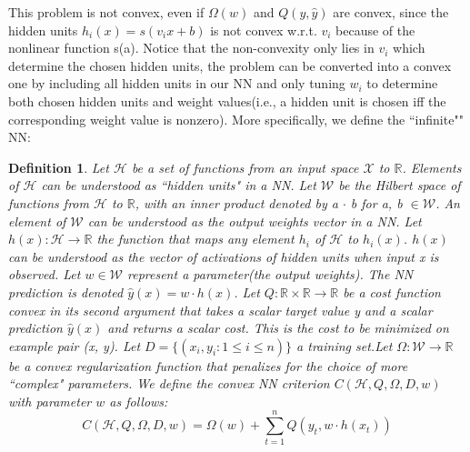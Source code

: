 \documentclass{article}
\begin{document}
This problem is not convex, even if $\Omega(w)$ and $Q(y,\hat{y})$ are convex, since the hidden units $h_{i}(x) = s(v_{i}x+b)$ is not convex w.r.t. $v_{i}$ because of the nonlinear function s(a). Notice that the non-convexity only lies in $v_{i}$ which determine the chosen hidden units, the problem can be converted into a convex one by including all hidden units in our NN and only tuning $w_{i}$ to determine both chosen hidden units and weight values(i.e., a hidden unit is chosen iff the corresponding weight value is nonzero). More specifically, we define the ``infinite"" NN:
\newtheorem{defn}{Definition}[section]
\begin{defn}
Let $\mathcal{H}$ be a set of functions from an input space $\mathcal{X}$ to $\mathbb{R}$. Elements of $\mathcal{H}$ can be understood as ``hidden units" in a NN. Let $\mathcal{W}$ be the Hilbert space of functions from $\mathcal{H}$ to $\mathbb{R}$, with an inner product denoted by a $\cdot$ b for a, b $\in \mathcal{W}$. An element of $\mathcal{W}$ can be understood as the output weights vector in a NN. Let $h(x):\mathcal{H}\rightarrow \mathbb{R}$ the function that maps any element $h_{i}$ of $\mathcal{H}$ to $h_{i}(x)$. $h(x)$ can be understood as the vector of activations of hidden units when input x is observed. Let $w \in \mathcal{W}$ represent a parameter(the output weights). The NN prediction is denoted $\hat{y}(x)= w\cdot h(x)$. Let $Q:\mathbb{R}\times \mathbb{R} \rightarrow \mathbb{R}$ be a cost function convex in its second argument that takes a scalar target value y and a scalar prediction $\hat{y}(x)$ and returns a scalar cost. This is the cost to be minimized on example pair (x, y). Let $D = \{ (x_{i},y_{i}:1\le i \le n)\}$ a training set.Let $\Omega : \mathcal{W} \rightarrow \mathbb{R}$ be a convex regularization function that penalizes for the choice of more ``complex" parameters. We define the convex NN criterion $C(\mathcal{H}, Q, \Omega, D, w)$ with parameter $w$ as follows:
\begin{equation}
C(\mathcal{H}, Q, \Omega, D, w) = \Omega(w) + \sum_{t=1}^{n}Q(y_{t}, w \cdot h(x_{t}))
\end{equation}
\end{defn}
\end{document}
